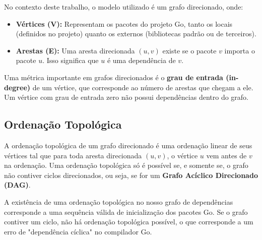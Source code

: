 \documentclass[12pt]{article}
\begin{document}
No contexto deste trabalho, o modelo utilizado é um grafo direcionado, onde:
\begin{itemize}
    \item \textbf{Vértices (V):} Representam os pacotes do projeto Go, tanto os locais (definidos no projeto) quanto os externos (bibliotecas padrão ou de terceiros).
    \item \textbf{Arestas (E):} Uma aresta direcionada $(u, v)$ existe se o pacote $v$ importa o pacote $u$. Isso significa que $u$ é uma dependência de $v$.
\end{itemize}

Uma métrica importante em grafos direcionados é o \textbf{grau de entrada (in-degree)} de um vértice, que corresponde ao número de arestas que chegam a ele. Um vértice com grau de entrada zero não possui dependências dentro do grafo.

\subsection{Ordenação Topológica}
A ordenação topológica de um grafo direcionado é uma ordenação linear de seus vértices tal que para toda aresta direcionada $(u, v)$, o vértice $u$ vem antes de $v$ na ordenação. Uma ordenação topológica só é possível se, e somente se, o grafo não contiver ciclos direcionados, ou seja, se for um \textbf{Grafo Acíclico Direcionado (DAG)}.

A existência de uma ordenação topológica no nosso grafo de dependências corresponde a uma sequência válida de inicialização dos pacotes Go. Se o grafo contiver um ciclo, não há ordenação topológica possível, o que corresponde a um erro de "dependência cíclica" no compilador Go.
\end{document}
